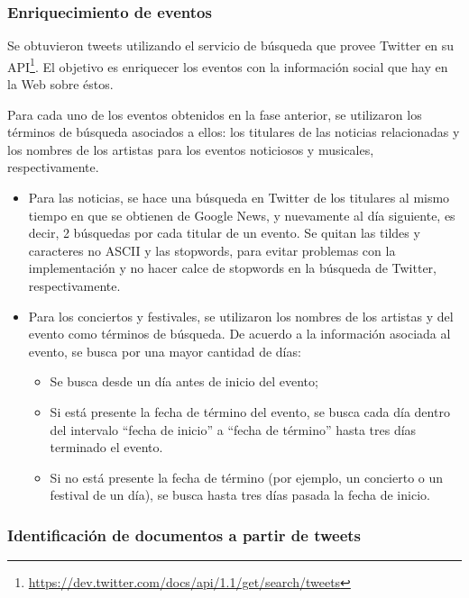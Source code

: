 \subsubsection{Enriquecimiento de eventos}

Se obtuvieron tweets utilizando el servicio de búsqueda que provee
Twitter en su
API\footnote{\href{https://dev.twitter.com/docs/api/1.1/get/search/tweets}{https://dev.twitter.com/docs/api/1.1/get/search/tweets} }. El
objetivo es enriquecer los eventos con la información social que hay
en la Web sobre éstos.

Para cada uno de los eventos obtenidos en la fase anterior, se
utilizaron los términos de búsqueda asociados a ellos: los titulares
de las noticias relacionadas y los nombres de los artistas para los
eventos noticiosos y musicales, respectivamente.

\begin{itemize}
\item Para las noticias, se hace una búsqueda en Twitter de los titulares
  al mismo tiempo en que se obtienen de Google News, y nuevamente al
  día siguiente, es decir, 2 búsquedas por cada titular de un evento.
  Se quitan las tildes y caracteres no ASCII y las stopwords, para
  evitar problemas con la implementación y no hacer calce de stopwords
  en la búsqueda de Twitter, respectivamente.
\item Para los conciertos y festivales, se utilizaron los nombres de los
  artistas y del evento como términos de búsqueda. De acuerdo a la
  información asociada al evento, se busca por una mayor cantidad de
  días:

\begin{itemize}
\item Se busca desde un día antes de inicio del evento;
\item Si está presente la fecha de término del evento, se busca cada día
    dentro del intervalo ``fecha de inicio'' a ``fecha de término'' hasta
    tres días terminado el evento.
\item Si no está presente la fecha de término (por ejemplo, un concierto
    o un festival de un día), se busca hasta tres días pasada la fecha
    de inicio.
\end{itemize}

\end{itemize}
\subsubsection{Identificación de documentos a partir de tweets}

